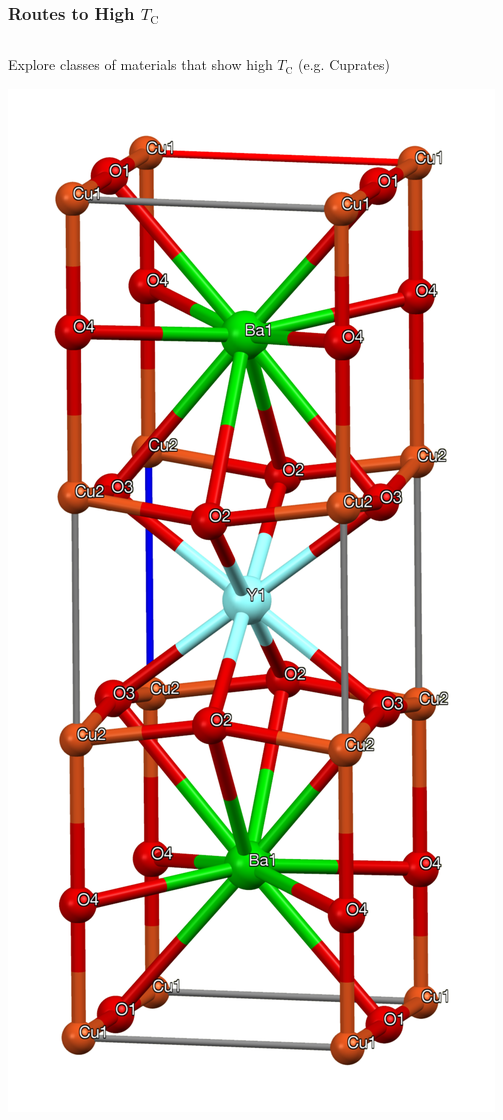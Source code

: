 \documentclass[aspectratio=169]{beamer}
\begin{document}
\begin{frame}
	\frametitle{Routes to High \(T_{\mathrm{C}}\)}
	
	\begin{columns}[T]
		\begin{column}{0.5\textwidth}
			\begin{center}
				Explore classes of materials that show high \(T_{\mathrm{C}}\) (e.g. Cuprates)
				
				\includegraphics[height=0.4\textheight]{figs/YBCO-xtal-unit-cell-3D-bs-17-atoms-labelled}
				

\end{center}
\end{column}
\end{columns}
\end{frame}
\end{document}

